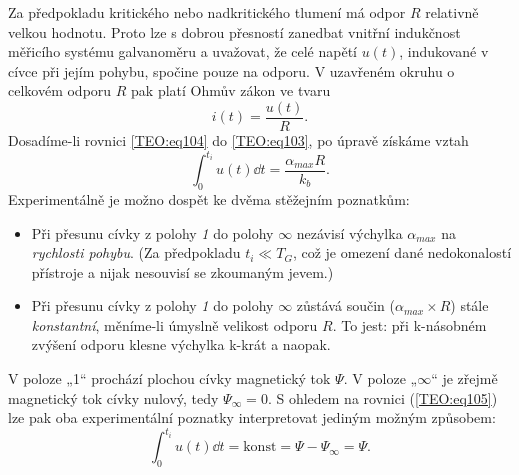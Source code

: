       
      Za předpokladu kritického nebo nadkritického tlumení má odpor \(R\) relativně velkou hodnotu. 
      Proto lze s dobrou přesností zanedbat vnitřní indukčnost měřicího systému galvanoměru a 
      uvažovat, že celé napětí \(u(t)\), indukované v cívce při jejím pohybu, spočine pouze na 
      odporu. V uzavřeném okruhu o celkovém odporu \(R\) pak platí Ohmův zákon ve tvaru
      \begin{equation}\label{TEO:eq104}
        i(t)=\frac{u(t)}{R}.
      \end{equation}    
      Dosadíme-li rovnici \ref{TEO:eq104} do \ref{TEO:eq103}, po úpravě získáme vztah
      \begin{equation}\label{TEO:eq105}
       \int_0^{t_i}u(t)\dd{t}=\frac{\alpha_{max}R}{k_b}.
      \end{equation}     
      Experimentálně je možno dospět ke dvěma stěžejním poznatkům:
      \begin{itemize}
        \item Při přesunu cívky z polohy \emph{1} do polohy \(\infty\) nezávisí výchylka
              \(\alpha_{max}\) na \emph{rychlosti pohybu}. (Za předpokladu \(t_i\ll T_G\), což je
              omezení dané nedokonalostí přístroje a nijak nesouvisí se zkoumaným jevem.)
        \item Při přesunu cívky z polohy \emph{1} do polohy \(\infty\) zůstává součin
              (\(\alpha_{max}\times R\)) stále \emph{konstantní}, měníme-li úmyslně velikost odporu
              \(R\). To jest: při k-násobném zvýšení odporu klesne výchylka k-krát a naopak. 
      \end{itemize}
  
      V poloze „1“ prochází plochou cívky magnetický tok \(\Psi\). V poloze „\(\infty\)“ je zřejmě
      magnetický tok cívky nulový, tedy \(\Psi_\infty = 0\). S ohledem na rovnici
      (\ref{TEO:eq105}) lze pak oba experimentální poznatky interpretovat jediným možným
      způsobem:
       \begin{equation}\label{TEO:eq106}
       \int_0^{t_i}u(t)\dd{t}=\text{konst}=\Psi-\Psi_\infty=\Psi.
      \end{equation}    

